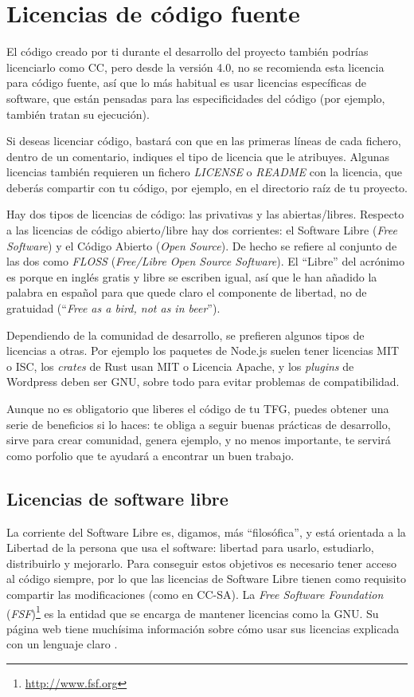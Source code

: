 


\section{Licencias de código fuente}

El código creado por ti durante el desarrollo del proyecto también podrías licenciarlo como CC, pero desde la versión 4.0, no se recomienda esta licencia para código fuente, así que lo más habitual es usar licencias específicas de software, que están pensadas para las especificidades del código (por ejemplo, también tratan su  ejecución). 

Si deseas licenciar código, bastará con que en las primeras líneas de cada fichero, dentro de un comentario, indiques el tipo de licencia que le atribuyes. Algunas licencias también requieren un fichero \textit{LICENSE} o \textit{README} con la licencia, que deberás compartir con tu código, por ejemplo, en el directorio raíz de tu proyecto.

Hay dos tipos de licencias de código: las privativas y las abiertas/libres. Respecto a las licencias de código abierto/libre hay dos corrientes: el Software Libre (\textit{Free Software}) y el Código Abierto (\textit{Open Source}). De hecho se refiere al conjunto de las dos como \textit{FLOSS} (\textit{Free/Libre Open Source Software}). El ``Libre'' del acrónimo es porque en inglés gratis y libre se escriben igual, así que le han añadido la palabra en español para que quede claro el componente de libertad, no de gratuidad (``\textit{Free as a bird, not as in beer}'').

Dependiendo de la comunidad de desarrollo, se prefieren algunos tipos de licencias a otras. Por ejemplo los paquetes de Node.js suelen tener licencias MIT o ISC, los \textit{crates} de Rust usan MIT o Licencia Apache, y los \textit{plugins} de Wordpress deben ser GNU, sobre todo para evitar problemas de compatibilidad.

Aunque no es obligatorio que liberes el código de tu TFG, puedes obtener una serie de beneficios si lo haces: te obliga a seguir buenas prácticas de desarrollo, sirve para crear comunidad, genera ejemplo, y no menos importante, te servirá como porfolio que te ayudará a encontrar un buen trabajo.

\subsection{Licencias de software libre}
La corriente del Software Libre es, digamos, más ``filosófica'', y está orientada a la Libertad de la persona que usa el software: libertad para usarlo, estudiarlo, distribuirlo y mejorarlo. Para conseguir estos objetivos es necesario tener acceso al código siempre, por lo que las licencias de Software Libre tienen como requisito compartir las modificaciones (como en CC-SA). La \textit{Free Software Foundation} (\textit{FSF})\footnote{\url{http://www.fsf.org}} es la entidad que se encarga de mantener licencias como la GNU. Su página web tiene muchísima información sobre cómo usar sus licencias explicada con un lenguaje claro \cite{FSFfaq}.

